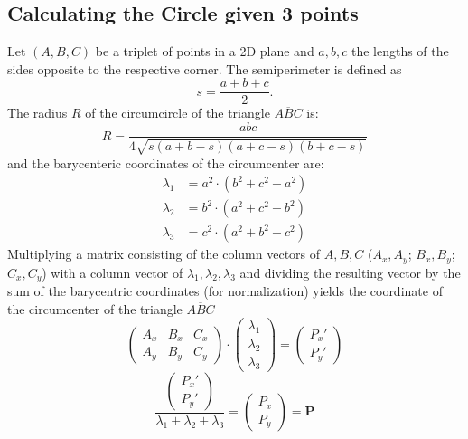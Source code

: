 \documentclass[11pt]{scrreprt}
\begin{document}

\subsection{Calculating the Circle given 3 points}

Let $(A,B,C)$ be a triplet of points in a 2D plane and $a,b,c$ the lengths of the sides opposite to the respective corner.
%
The semiperimeter is defined as
%
\begin{equation}
  s = \frac{a+b+c}{2}.
\end{equation}
%
The radius $R$ of the circumcircle of the triangle $\overline{ABC}$ is:
\begin{equation}
  R = \frac{abc}{4\sqrt{s(a+b-s)(a+c-s)(b+c-s)}}
\end{equation}
and the barycenteric coordinates of the circumcenter are:
\begin{align}
  \lambda_1 &= a^2\cdot(b^2+c^2-a^2)\\
  \lambda_2 &= b^2\cdot(a^2+c^2-b^2)\\
  \lambda_3 &= c^2\cdot(a^2+b^2-c^2)
\end{align}
Multiplying a matrix consisting of the column vectors of $A,B,C$ ($A_x,A_y$; $B_x,B_y$; $C_x,C_y$) with a column vector of $\lambda_1, \lambda_2, \lambda_3$ and dividing the resulting vector by the sum of the barycentric coordinates (for normalization) yields the coordinate of the circumcenter of the triangle $\overline{ABC}$ 
%
\begin{equation}
  \begin{pmatrix}
    A_x & B_x & C_x \\
    A_y & B_y & C_y
  \end{pmatrix} \cdot \begin{pmatrix}
    \lambda_1\\
    \lambda_2\\
    \lambda_3
  \end{pmatrix} = \begin{pmatrix}
    P_x'\\
    P_y'
  \end{pmatrix}
\end{equation}
%
\begin{equation}
  \frac{\begin{pmatrix}
    P_x'\\
    P_y'
  \end{pmatrix}}{\lambda_1+\lambda_2+\lambda_3} = \begin{pmatrix}
    P_x\\
    P_y
  \end{pmatrix} = \boldsymbol{P}
\end{equation}
\end{document}
